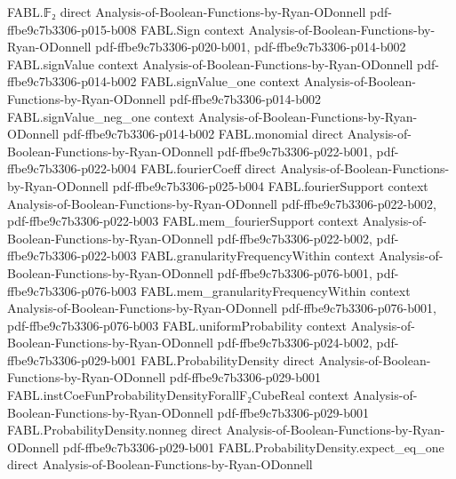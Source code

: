 \begin{theorem}
\label{FABL.convolution_apply_swap}
\leanok
{}
\proofstep
  {FABL.𝔽₂}
  {direct}
  {Analysis-of-Boolean-Functions-by-Ryan-ODonnell}
  {pdf-ffbe9c7b3306-p015-b008}
\proofstep
  {FABL.Sign}
  {context}
  {Analysis-of-Boolean-Functions-by-Ryan-ODonnell}
  {pdf-ffbe9c7b3306-p020-b001,
    pdf-ffbe9c7b3306-p014-b002}
\proofstep
  {FABL.signValue}
  {context}
  {Analysis-of-Boolean-Functions-by-Ryan-ODonnell}
  {pdf-ffbe9c7b3306-p014-b002}
\proofstep
  {FABL.signValue_one}
  {context}
  {Analysis-of-Boolean-Functions-by-Ryan-ODonnell}
  {pdf-ffbe9c7b3306-p014-b002}
\proofstep
  {FABL.signValue_neg_one}
  {context}
  {Analysis-of-Boolean-Functions-by-Ryan-ODonnell}
  {pdf-ffbe9c7b3306-p014-b002}
\proofstep
  {FABL.monomial}
  {direct}
  {Analysis-of-Boolean-Functions-by-Ryan-ODonnell}
  {pdf-ffbe9c7b3306-p022-b001,
    pdf-ffbe9c7b3306-p022-b004}
\proofstep
  {FABL.fourierCoeff}
  {direct}
  {Analysis-of-Boolean-Functions-by-Ryan-ODonnell}
  {pdf-ffbe9c7b3306-p025-b004}
\proofstep
  {FABL.fourierSupport}
  {context}
  {Analysis-of-Boolean-Functions-by-Ryan-ODonnell}
  {pdf-ffbe9c7b3306-p022-b002,
    pdf-ffbe9c7b3306-p022-b003}
\proofstep
  {FABL.mem_fourierSupport}
  {context}
  {Analysis-of-Boolean-Functions-by-Ryan-ODonnell}
  {pdf-ffbe9c7b3306-p022-b002,
    pdf-ffbe9c7b3306-p022-b003}
\proofstep
  {FABL.granularityFrequencyWithin}
  {context}
  {Analysis-of-Boolean-Functions-by-Ryan-ODonnell}
  {pdf-ffbe9c7b3306-p076-b001,
    pdf-ffbe9c7b3306-p076-b003}
\proofstep
  {FABL.mem_granularityFrequencyWithin}
  {context}
  {Analysis-of-Boolean-Functions-by-Ryan-ODonnell}
  {pdf-ffbe9c7b3306-p076-b001,
    pdf-ffbe9c7b3306-p076-b003}
\proofstep
  {FABL.uniformProbability}
  {context}
  {Analysis-of-Boolean-Functions-by-Ryan-ODonnell}
  {pdf-ffbe9c7b3306-p024-b002,
    pdf-ffbe9c7b3306-p029-b001}
\proofstep
  {FABL.ProbabilityDensity}
  {direct}
  {Analysis-of-Boolean-Functions-by-Ryan-ODonnell}
  {pdf-ffbe9c7b3306-p029-b001}
\proofstep
  {FABL.instCoeFunProbabilityDensityForallF₂CubeReal}
  {context}
  {Analysis-of-Boolean-Functions-by-Ryan-ODonnell}
  {pdf-ffbe9c7b3306-p029-b001}
\proofstep
  {FABL.ProbabilityDensity.nonneg}
  {direct}
  {Analysis-of-Boolean-Functions-by-Ryan-ODonnell}
  {pdf-ffbe9c7b3306-p029-b001}
\proofstep
  {FABL.ProbabilityDensity.expect_eq_one}
  {direct}
  {Analysis-of-Boolean-Functions-by-Ryan-ODonnell}

\end{theorem}

